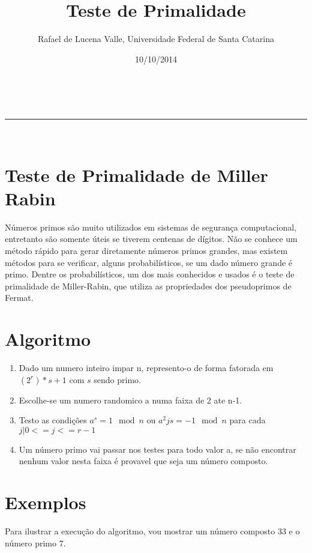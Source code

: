 \documentclass[a4paper,11pt]{article}
\makeatletter
\newcommand{\linia}{\rule{\linewidth}{0.5pt}}
\theoremstyle{mytheor}
\renewcommand{\maketitle}{
\begin{center}
\vspace{2ex}
{\huge \textsc{\@title}}
\vspace{1ex}
\\
\linia\\
\@author \hfill \@date
\vspace{4ex}
\end{center}
}
\makeatother
\begin{document}
\title{Teste de Primalidade}

\author{Rafael de Lucena Valle, Universidade Federal de Santa Catarina}

\date{10/10/2014}

\maketitle

\section*{Teste de Primalidade de Miller Rabin}
Números primos são muito utilizados em sistemas de segurança computacional, entretanto são somente úteis se tiverem centenas de dígitos. Não se conhece um método rápido para gerar diretamente números primos grandes, mas existem métodos para se verificar, alguns probabilísticos, se um dado número grande é primo. Dentre os probabilísticos, um dos mais conhecidos e usados é o teste de primalidade de Miller-Rabin, que utiliza as propriedades dos pseudoprimos de Fermat.


\section*{Algoritmo}
\begin{enumerate}
    \item Dado um numero inteiro impar n, represento-o de forma fatorada em $(2^r)*s + 1$ com $s$ sendo primo.
    \item Escolhe-se um numero randomico a numa faixa de 2 ate n-1.
    \item Testo as condições $a^s = 1 \mod n$ ou $a^2js = -1 \mod n$ para cada $j | 0 <= j <= r-1$
    \item Um número primo vai passar nos testes para todo valor a, se não encontrar nenhum valor nesta faixa é provavel que seja um número composto.
\end{enumerate}

\section*{Exemplos}

Para ilustrar a execução do algoritmo, vou mostrar um número composto 33 e o número primo 7.
\end{document}
